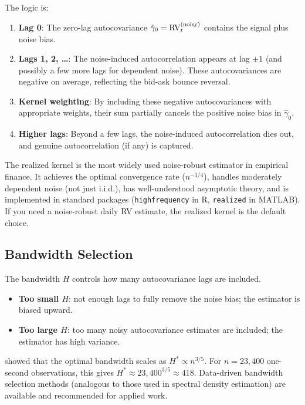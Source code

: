 The logic is:
\begin{enumerate}[nosep]
  \item \textbf{Lag 0}: The zero-lag autocovariance $\hat{\gamma}_0 = \operatorname{RV}_t^{(\text{noisy})}$ contains the signal plus noise bias.
  \item \textbf{Lags 1, 2, \ldots}: The noise-induced autocorrelation appears at lag $\pm 1$ (and possibly a few more lags for dependent noise). These autocovariances are negative on average, reflecting the bid-ask bounce reversal.
  \item \textbf{Kernel weighting}: By including these negative autocovariances with appropriate weights, their sum partially cancels the positive noise bias in $\hat{\gamma}_0$.
  \item \textbf{Higher lags}: Beyond a few lags, the noise-induced autocorrelation dies out, and genuine autocorrelation (if any) is captured.
\end{enumerate}

\begin{keyidea}
The realized kernel is the most widely used noise-robust estimator in empirical finance.
It achieves the optimal convergence rate ($n^{-1/4}$), handles moderately dependent noise (not just i.i.d.), has well-understood asymptotic theory, and is implemented in standard packages (\texttt{highfrequency} in R, \texttt{realized} in MATLAB).
If you need a noise-robust daily RV estimate, the realized kernel is the default choice.
\end{keyidea}

\subsection{Bandwidth Selection}

The bandwidth $H$ controls how many autocovariance lags are included.
\begin{itemize}[nosep]
  \item \textbf{Too small $H$}: not enough lags to fully remove the noise bias; the estimator is biased upward.
  \item \textbf{Too large $H$}: too many noisy autocovariance estimates are included; the estimator has high variance.
\end{itemize}

\citet{BNHLS2008} showed that the optimal bandwidth scales as $H^* \propto n^{3/5}$.
For $n = 23{,}400$ one-second observations, this gives $H^* \approx 23{,}400^{3/5} \approx 418$.
Data-driven bandwidth selection methods (analogous to those used in spectral density estimation) are available and recommended for applied work.


